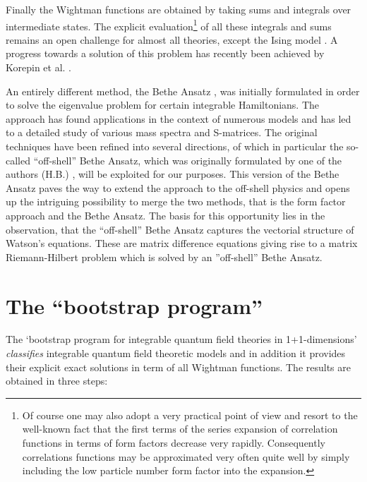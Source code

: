 \documentclass[a4paper,12pt]{article}
\begin{document}
Finally the Wightman functions are obtained by taking sums and integrals
over intermediate states. The explicit evaluation\footnote{%
Of course one may also adopt a very practical point of view and resort to
the well-known fact that the first terms of the series expansion of
correlation functions in terms of form factors decrease very rapidly.
Consequently correlations functions may be approximated very often quite
well by simply including the low particle number form factor into the
expansion.} of all these integrals and sums remains an open challenge for
almost all theories, except the Ising model \cite{B-J,BKW}. A progress
towards a solution of this problem has recently been achieved by Korepin et
al. \cite{Korepin}.

An entirely different method, the Bethe Ansatz \cite{BA}, was initially
formulated in order to solve the eigenvalue problem for certain integrable
Hamiltonians. The approach has found applications in the context of numerous
models and has led to a detailed study of various mass spectra and
S-matrices. The original techniques have been refined into several
directions, of which in particular the so-called ``off-shell'' Bethe Ansatz,
which was originally formulated by one of the authors (H.B.) \cite{OSBA,BKZ},
will be exploited for our purposes. This version of the Bethe Ansatz paves
the way to extend the approach to the off-shell physics and opens up the
intriguing possibility to merge the two methods, that is the form factor
approach and the Bethe Ansatz. The basis for this opportunity lies in the
observation, that the ``off-shell'' Bethe Ansatz captures the vectorial
structure of Watson's equations. These are matrix difference equations
giving rise to a matrix Riemann-Hilbert problem which is solved by an
''off-shell'' Bethe Ansatz.

\section{The ``bootstrap program''}

The `bootstrap program for integrable quantum field theories in
1+1-dimensions' \emph{classifies} integrable quantum field theoretic models
and in addition it provides their explicit exact solutions in term of all
Wightman functions. The results are obtained in three steps:
\end{document}
